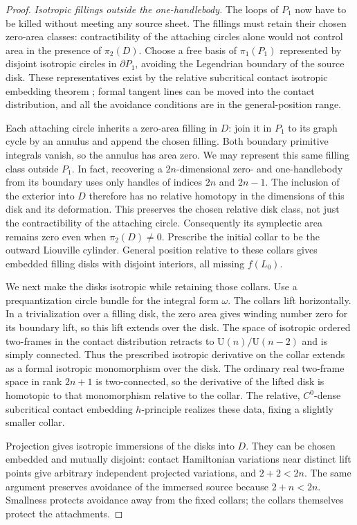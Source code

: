 \begin{proof}
\emph{Isotropic fillings outside the one-handlebody.}
The loops of $P_1$ now have to be killed without meeting any source
sheet.  The fillings must retain their chosen zero-area classes:
contractibility of the attaching circles alone would not control area
in the presence of $\pi_2(D)$.  Choose a free basis of $\pi_1(P_1)$
represented by disjoint isotropic circles in $\partial P_1$, avoiding the Legendrian boundary of the
source disk.  These representatives exist by the relative subcritical
contact isotropic embedding theorem
\cite[Theorem~12.4.1]{EliashbergMishachev2002}; formal tangent lines
can be moved into the contact distribution, and all the avoidance
conditions are in the general-position range.

Each attaching circle inherits a zero-area filling in $D$: join it
in $P_1$ to its graph cycle by an annulus and append the chosen
filling.  Both boundary primitive integrals vanish, so the annulus
has area zero.  We may represent this same filling class outside $P_1$.
In fact, recovering a $2n$-dimensional zero- and one-handlebody from
its boundary uses only handles of indices $2n$ and $2n-1$.
The inclusion of the exterior into $D$ therefore has no relative
homotopy in the dimensions of this disk and its deformation.
This preserves the chosen relative disk class, not just the
contractibility of the attaching circle.  Consequently its
symplectic area remains zero even when $\pi_2(D)\neq0$.
Prescribe the initial collar to be the outward Liouville cylinder.
General position relative to these collars gives embedded filling
disks with disjoint interiors, all missing $f(L_0)$.

We next make the disks isotropic while retaining those collars.
Use a prequantization circle bundle for the integral form $\omega$.
The collars lift horizontally.  In a trivialization over a filling
disk, the zero area gives winding number zero for its boundary
lift, so this lift extends over the disk.  The space of isotropic
ordered two-frames in the contact distribution retracts to
$\mathrm U(n)/\mathrm U(n-2)$ and is simply connected.  Thus the
prescribed isotropic derivative on the collar extends as a formal
isotropic monomorphism over the disk.  The ordinary real two-frame
space in rank $2n+1$ is two-connected, so the derivative of the
lifted disk is homotopic to that monomorphism relative to the
collar.  The relative, $C^0$-dense subcritical contact embedding
$h$-principle realizes these data, fixing a slightly smaller collar.

Projection gives isotropic immersions of the disks into $D$.
They can be chosen embedded and mutually disjoint: contact
Hamiltonian variations near distinct lift points give arbitrary
independent projected variations, and $2+2<2n$.  The same argument
preserves avoidance of the immersed source because $2+n<2n$.
Smallness protects avoidance away from the fixed collars; the
collars themselves protect the attachments.


\end{proof}
